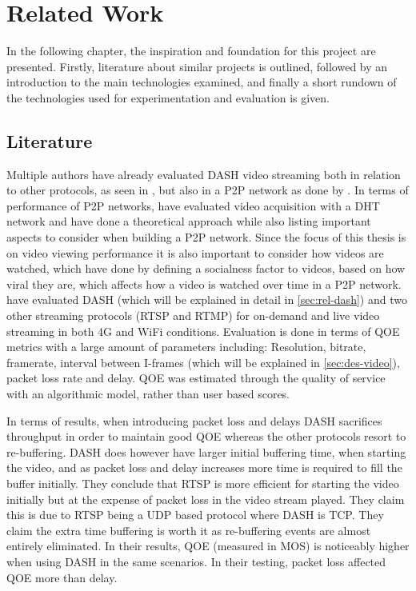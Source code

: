 \chapter{Related Work}
\label{cha:related-work}
In the following chapter, the inspiration and foundation for this project are presented. Firstly, literature about similar projects is outlined, followed by an introduction to the main technologies examined, and finally a short rundown of the technologies used for experimentation and evaluation is given. 

\section{Literature}
Multiple authors have already evaluated \ac{DASH} video streaming both in relation to other protocols, as seen in \citet{aloman2015performance}, but also in a \ac{P2P} network as done by \citet{gazdar2017toward}. In terms of performance of \ac{P2P} networks, \citet{nguyen2009p2p} have evaluated video acquisition with a \ac{DHT} network and \citet{qiu2004modeling} have done a theoretical approach while also listing important aspects to consider when building a \ac{P2P} network. Since the focus of this thesis is on video viewing performance it is also important to consider how videos are watched, which \citet{broxton2013catching} have done by defining a socialness factor to videos, based on how viral they are, which affects how a video is watched over time in a \ac{P2P} network.
\\


\citet{aloman2015performance} have evaluated \ac{DASH} (which will be explained in detail in \autoref{sec:rel-dash}) and two other streaming protocols (\ac{RTSP} and \ac{RTMP}) for on-demand and live video streaming in both 4G and WiFi conditions. Evaluation is done in terms of \ac{QOE} metrics with a large amount of parameters including: Resolution, bitrate, framerate, interval between \acsp{I-frame} (which will be explained in \autoref{sec:des-video}), packet loss rate and delay. \ac{QOE} was estimated through the quality of service with an algorithmic model, rather than user based scores.

In terms of results, when introducing packet loss and delays \ac{DASH} sacrifices throughput in order to maintain good \ac{QOE} whereas the other protocols resort to re-buffering. \ac{DASH} does however have larger initial buffering time, when starting the video, and as packet loss and delay increases more time is required to fill the buffer initially. They conclude that \ac{RTSP} is more efficient for starting the video initially but at the expense of packet loss in the video stream played. They claim this is due to \ac{RTSP} being a \ac{UDP} based protocol where \ac{DASH} is \ac{TCP}. They claim the extra time buffering is worth it as re-buffering events are almost entirely eliminated. In their results, \ac{QOE} (measured in \ac{MOS}) is noticeably higher when using \ac{DASH} in the same scenarios. In their testing, packet loss affected \ac{QOE} more than delay.
\\


